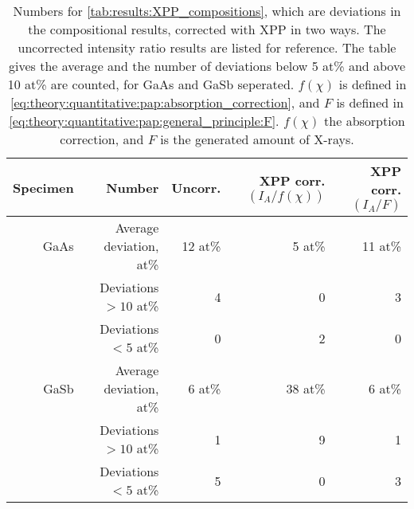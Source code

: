 \begin{table}[phtb]
    \begin{center}
        \caption{
            Numbers for \cref{tab:results:XPP_compositions}, which are deviations in the compositional results, corrected with XPP in two ways.
            The uncorrected intensity ratio results are listed for reference.
            The table gives the average and the number of deviations below 5 at\% and above 10 at\% are counted, for GaAs and GaSb seperated.
            $f(\chi)$ is defined in \cref{eq:theory:quantitative:pap:absorption_correction}, and $F$ is defined in \cref{eq:theory:quantitative:pap:general_principle:F}.
            $f(\chi)$ the absorption correction, and $F$ is the generated amount of X-rays.
        }
        \label{tab:results:XPP_compositions_stats}
        \begin{tabular}{rrrrr}
            \hline
            \textbf{Specimen} & \textbf{Number}         & \textbf{Uncorr.} & \textbf{XPP corr. $(I_A/f(\chi))$} & \textbf{XPP corr. $(I_A/F)$} \\
            \hline

            GaAs              & Average deviation, at\% & 12 at\%          & 5 at\%                             & 11 at\%                      \\
                              & Deviations $>10$ at\%   & 4                & 0                                  & 3                            \\
                              & Deviations  $<5$  at\%  & 0                & 2                                  & 0                            \\
            \hline

            GaSb              & Average deviation, at\% & 6 at\%           & 38 at\%                            & 6 at\%                       \\
                              & Deviations $>10$ at\%   & 1                & 9                                  & 1                            \\
                              & Deviations  $<5$  at\%  & 5                & 0                                  & 3                            \\

            \hline
        \end{tabular}
    \end{center}
\end{table}

